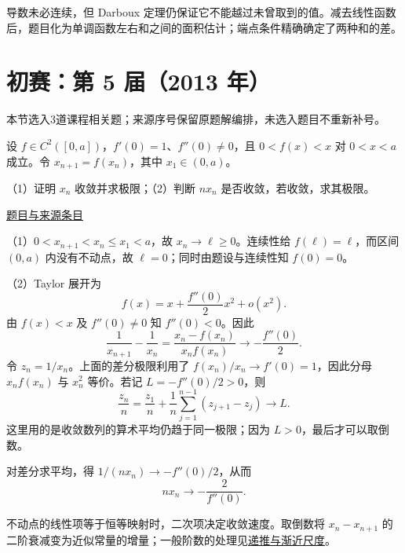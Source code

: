 \documentclass[UTF8,12pt,a4paper,fontset=fandol]{ctexart}
\begin{document}
\begin{remark}[方法与条件]导数未必连续，但 Darboux 定理仍保证它不能越过未曾取到的值。减去线性函数后，题目化为单调函数左右和之间的面积估计；端点条件精确确定了两种和的差。\end{remark}

\section{初赛：第 5 届（2013 年）}

本节选入3道课程相关题；来源序号保留原题解编排，未选入题目不重新补号。

\begin{example}[来源序号3]\label{ex:pre05-math:3}\label{pr:pre05-math:3}

设 $f\in C^2([0,a])$，$f'(0)=1$、$f''(0)\ne0$，且 $0<f(x)<x$ 对 $0<x<a$ 成立。令 $x_{n+1}=f(x_n)$，其中 $x_1\in(0,a)$。

（1）证明 $x_n$ 收敛并求极限；（2）判断 $nx_n$ 是否收敛，若收敛，求其极限。

\par\href{https://github.com/lzxcr/cmc-mathematics/blob/64916fa1fdbc3e444a652eca204d5669058ee321/src/problems/preliminary/05/03.md}{题目与来源条目}

\end{example}

\begin{solve}\label{ans:pre05-math:3}

（1）$0<x_{n+1}<x_n\le x_1<a$，故 $x_n\to\ell\ge0$。连续性给 $f(\ell)=\ell$，而区间 $(0,a)$ 内没有不动点，故 $\ell=0$；同时由题设与连续性知 $f(0)=0$。

（2）Taylor 展开为
\[
f(x)=x+\frac{f''(0)}2x^2+o(x^2).
\]
由 $f(x)<x$ 及 $f''(0)\ne0$ 知 $f''(0)<0$。因此
\[
\frac1{x_{n+1}}-\frac1{x_n}
=\frac{x_n-f(x_n)}{x_nf(x_n)}
\longrightarrow-\frac{f''(0)}2.
\]
令 $z_n=1/x_n$。上面的差分极限利用了 $f(x_n)/x_n\to f'(0)=1$，因此分母 $x_nf(x_n)$ 与 $x_n^2$ 等价。若记 $L=-f''(0)/2>0$，则
\[
\frac{z_n}{n}=\frac{z_1}{n}+\frac1n\sum_{j=1}^{n-1}(z_{j+1}-z_j)\longrightarrow L.
\]
这里用的是收敛数列的算术平均仍趋于同一极限；因为 $L>0$，最后才可以取倒数。

对差分求平均，得 $1/(nx_n)\to-f''(0)/2$，从而
\[
\boxed{\displaystyle nx_n\longrightarrow-\frac2{f''(0)}}.
\]

\end{solve}

\begin{remark}[方法与条件]不动点的线性项等于恒等映射时，二次项决定收敛速度。取倒数将 $x_n-x_{n+1}$ 的二阶衰减变为近似常量的增量；一般阶数的处理见\hyperref[app:estimate-recursion]{递推与渐近尺度}。\end{remark}
\end{document}
